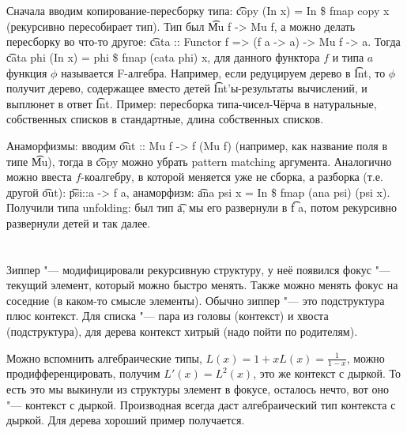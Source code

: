 \section{} %
Сначала вводим копирование-пересборку типа: \t{copy (In x) = In \$ fmap copy x} (рекурсивно пересобирает тип).
Тип был \t{Mu f -> Mu f}, а можно делать пересборку во что-то другое: \t{cata :: Functor f => (f a -> a) -> Mu f -> a}.
Тогда \t{cata phi (In x) = phi \$ fmap (cata phi) x}, для данного функтора $f$ и типа $a$
функция $\phi$ называется F-алгебра.
Например, если редуцируем дерево в \t{Int}, то $\phi$ получит дерево, содержащее вместо детей \t{Int}'ы-результаты вычислений,
и выплюнет в ответ \t{Int}.
Пример: пересборка типа-чисел-Чёрча в натуральные, собственных списков в стандартные, длина собственных списков.

Анаморфизмы: вводим \t{out :: Mu f -> f (Mu f)} (например, как название поля в типе \t{Mu}), тогда в \t{copy} можно убрать
pattern matching аргумента.
Аналогично можно ввеста $f$-коалгебру, в которой меняется уже не сборка, а разборка (т.е. другой \t{out}):
\t{psi::a -> f a}, анаморфизм: \t{ana psi x = In \$ fmap (ana psi) (psi x)}.
Получили типа unfolding: был тип \t{a}, мы его развернули в \t{f a}, потом рекурсивно развернули детей и так далее.

\section{} %
Зиппер "--- модифицировали рекурсивную структуру, у неё появился фокус "--- текущий элемент, который можно быстро менять.
Также можно менять фокус на соседние (в каком-то смысле элементы).
Обычно зиппер "--- это подструктура плюс контекст.
Для списка "--- пара из головы (контекст) и хвоста (подструктура), для дерева контекст хитрый (надо пойти по родителям).

Можно вспомнить алгебраические типы, $L(x)=1+xL(x)=\frac{1}{1-x}$, можно продифференцировать, получим
$L'(x)=L^2(x)$, это же контекст с дыркой.
То есть это мы выкинули из структуры элемент в фокусе, осталось нечто, вот оно "--- контекст с дыркой.
Производная всегда даст алгебраический тип контекста с дыркой.
Для дерева хороший пример получается.

